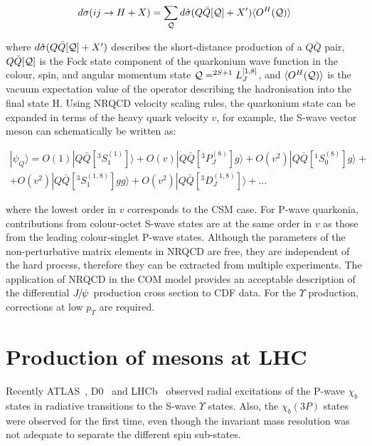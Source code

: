 \begin{equation}
d\sigma ( i j \rightarrow H + X ) = \sum_{\cal{Q}} d{\hat{\sigma}}(Q{\bar{Q}}[{\cal{Q}}] + X') 
\langle O^H({\cal{Q}})\rangle
\end{equation}

\noindent where $d{\hat{\sigma}}(Q{\bar{Q}}[{\cal{Q}}] + X')$ describes the
short-distance production of a  $Q{\bar{Q}}$ pair, $Q{\bar{Q}}[{\cal{Q}}]$ is
the Fock state component of the quarkonium wave function in the colour, spin,
and angular momentum state ${\cal{Q}} =^{2S+1} L_J^{[1,8]}$, and
$\langle O^H({\cal{Q}})\rangle$ is the vacuum expectation value of the operator describing
the hadronisation into the final state H. Using NRQCD velocity scaling rules,
the quarkonium state can be expanded in terms of the heavy quark velocity $v$,
for example, the S-wave vector meson can schematically be written as:

\begin{equation}
\begin{split}
|\psi_Q\rangle = O(1)|Q{\bar{Q}}[^3S_1^{(1)}]   \rangle + O(v)|Q{\bar{Q}}[^3P_J^{(8)}] g\rangle + O(v^2)|Q{\bar{Q}}[^1S_0^{(8)}]    g\rangle + \\
+ O(v^2)|Q{\bar{Q}}[^3S_1^{(1,8)}]  gg\rangle + O(v^2)|Q{\bar{Q}}[^3D_J^{(1,8)}]\rangle + \ldots
\end{split}
\end{equation}   

\noindent where the lowest order in $v$ corresponds to the CSM case. For P-wave
quarkonia, contributions from colour-octet S-wave states are at the same order
in $v$ as those from the leading colour-singlet P-wave states. Although the
parameters of the non-perturbative matrix elements in NRQCD are free, they are
independent of the hard process, therefore they can be extracted from multiple
experiments. The application of NRQCD in the COM model provides an acceptable
description of the differential ${{J\mskip -3mu/\mskip -2mu\psi\mskip 2mu}}$ production cross section to CDF data.
For the $\Upsilon$ production, corrections at low $p_T$ are required.

\section{Production of \chib mesons at LHC}

Recently ATLAS~\cite{Aad:2011ih}, D0~\cite{Abazov:2012gh} and
LHCb~\cite{LHCb-CONF-2012-020} 
observed radial excitations of the P-wave $\chi_b$ states in radiative
transitions to the S-wave $\Upsilon$ states. Also, the $\chi_b(3P)$ states 
were observed for the first time, even though the invariant mass resolution was
not adequate to separate the different spin sub-states.

